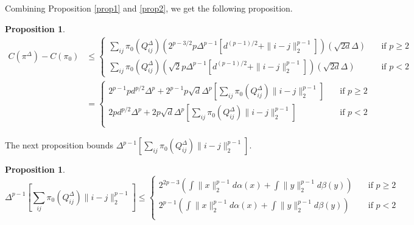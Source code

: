 \documentclass[12pt]{report}
\theoremstyle{definition}
\newtheorem{prop}[defi]{Proposition}
\theoremstyle{remark}
\begin{document}
Combining Proposition \ref{prop1} and \ref{prop2}, we get the following proposition.

\begin{prop}
\begin{align*}
C(\pi^{\Delta})-C(\pi_{0})&\leq 
\begin{cases}
\sum_{ij} \pi_0(Q_{ij}^{\Delta}) \left(2^{p-3/2} p \Delta^{p-1}[d^{(p-1)/2} + \|i-j\|_2^{p-1}]\right) \left(\sqrt{2d} \Delta\right) \quad &\text{if } p\geq 2 \\
\sum_{ij} \pi_0(Q_{ij}^{\Delta}) \left(\sqrt 2 p \Delta^{p-1}[d^{(p-1)/2} + \|i-j\|_2^{p-1}]\right) \left(\sqrt{2d} \Delta\right) \quad &\text{if } p< 2
\end{cases}
\\
&= 
\begin{cases}
2^{p-1}pd^{p/2}\Delta^p + 2^{p-1}p \sqrt d \Delta^p \left[\sum_{ij} \pi_0(Q_{ij}^{\Delta}) \|i-j\|_2^{p-1} \right] \quad &\text{if } p\geq 2 \\
2pd^{p/2}\Delta^p + 2p \sqrt d \Delta^p \left[\sum_{ij} \pi_0(Q_{ij}^{\Delta}) \|i-j\|_2^{p-1} \right] \quad &\text{if } p< 2 \\
\end{cases}
\tag{1} \label{1}
\end{align*}
\end{prop}


The next proposition bounds $\Delta^{p-1} \left[\sum_{ij} \pi_0(Q_{ij}^{\Delta}) \|i-j\|_2^{p-1} \right]$.\\

\begin{prop}\label{prop3}
	$$\Delta^{p-1} \left[\sum_{ij} \pi_0(Q_{ij}^{\Delta}) \|i-j\|_2^{p-1} \right]\leq
		\begin{cases}
		2^{2p-3} \left(\int \|x\|_2^{p-1}d\alpha(x)+ \int \|y\|_2^{p-1}d\beta(y)\right) \quad &\text{if } p\geq 2 \\
		2^{p-1} \left(\int \|x\|_2^{p-1}d\alpha(x)+ \int \|y\|_2^{p-1}d\beta(y)\right) \quad &\text{if } p< 2 \\
		\end{cases}$$
\end{prop}
\end{document}
